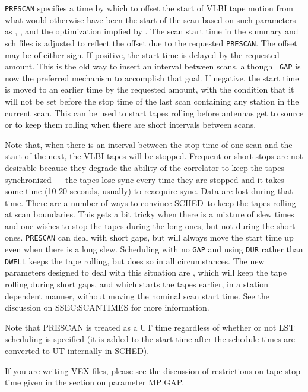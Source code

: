 \documentclass{report}
\newcommand{\sched}{{\sc SCHED}}
\newcommand{\schedb}{{\sc SCHED~}}
\begin{document}
{\tt PRESCAN} specifies a time by which to offset the start of VLBI
tape motion from what would otherwise have been the start of the scan
based on such parameters as ,
, and the optimization implied by
.  The scan start time in the summary
and sch files is adjusted to reflect the offset due to the
requested {\tt PRESCAN}.  The offset may be of either sign.  If
positive, the start time is delayed by the requested amount.  This
is the old way to insert an interval between scans, although {\tt
GAP} is now the preferred mechanism to accomplish that goal.  If
negative, the start time is moved to an earlier time by the requested
amount, with the condition that it will not be set before the stop
time of the last scan containing any station in the current scan.
This can be used to start tapes rolling before antennas get to source
or to keep them rolling when there are short intervals between scans.

Note that, when there is an interval between the stop time of one scan
and the start of the next, the VLBI tapes will be stopped.  Frequent
or short stops are not desirable because they degrade the ability of
the correlator to keep the tapes synchronized --- the tapes lose sync
every time they are stopped and it takes some time (10-20 seconds,
usually) to reacquire sync.  Data are lost during that time.  There
are a number of ways to convince \schedb to keep the tapes rolling at
scan boundaries.  This gets a bit tricky when there is a mixture of
slew times and one wishes to stop the tapes during the long ones, but
not during the short ones.  {\tt PRESCAN} can deal with short gaps,
but will always move the start time up even when there is a long slew.
Scheduling with no {\tt GAP} and using {\tt DUR} rather than {\tt
DWELL} keeps the tape rolling, but does so in all circumstances.
The new parameters designed to deal with this situation are , which will keep the tape rolling during short
gaps, and  which starts the
tapes earlier, in a station dependent manner, without moving the
nominal scan start time.  See the discussion on 
{SSEC:SCANTIMES} for more information.

Note that PRESCAN is treated as a UT time regardless of whether or
not LST scheduling is specified (it is added to the start time after
the schedule times are converted to UT internally in \sched).

If you are writing VEX files, please see the discussion of restrictions
on tape stop time given in the section on parameter 
{MP:GAP}.
\end{document}
